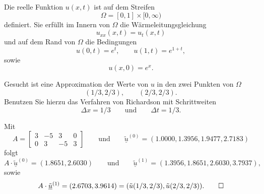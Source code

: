 Die reelle Funktion $u(x,t)$ ist auf dem Streifen
\[
\Omega = [0, 1] \times [0,\infty)
\]
definiert.
Sie erfüllt im Innern von $\Omega$ die Wärmeleitungsgleichung
\[
u_{xx}(x,t) = u_{t}(x,t)
\]
und auf dem Rand von $\Omega$ die Bedingungen
\[
u(0,t) = e^{t}, \qquad u(1,t) = e^{1+t},
\]
sowie
\[
u(x,0) = e^x.
\]

\vspace{1mm}

Gesucht ist eine Approximation der Werte von $u$ in den zwei Punkten von
$\Omega$
\[
(1/3,2/3), \qquad  (2/3,2/3).
\]
Benutzen Sie hierzu das Verfahren von Richardson mit Schrittweiten
\[
\Delta x = 1/3
\qquad
\text{und}
\qquad
\Delta t = 1/3.
\]

\begin{loesung}
Mit
\[
A = \left[\begin{array}{rrrr} 
3 & -5 & 3 & 0 \\
0 & 3 & -5 & 3 \end{array}\right]
\qquad
\text{und}
\qquad
\underline{\tilde u}^{(0)} = (1.0000, 1.3956, 1.9477, 2.7183)
\]
folgt
\[
A \cdot \underline{\tilde u}^{(0)} = (1.8651, 2.6030)
\qquad
\text{und}
\qquad
\underline{\tilde u}^{(1)} = (1.3956, 1.8651, 2.6030, 3.7937),
\]
sowie
\[
A \cdot \underline{\tilde u}^{(1)} = (2.6703, 3.9614)
= (\tilde u(1/3,2/3), \tilde u(2/3,2/3)).
\qedhere
\]
\end{loesung}

